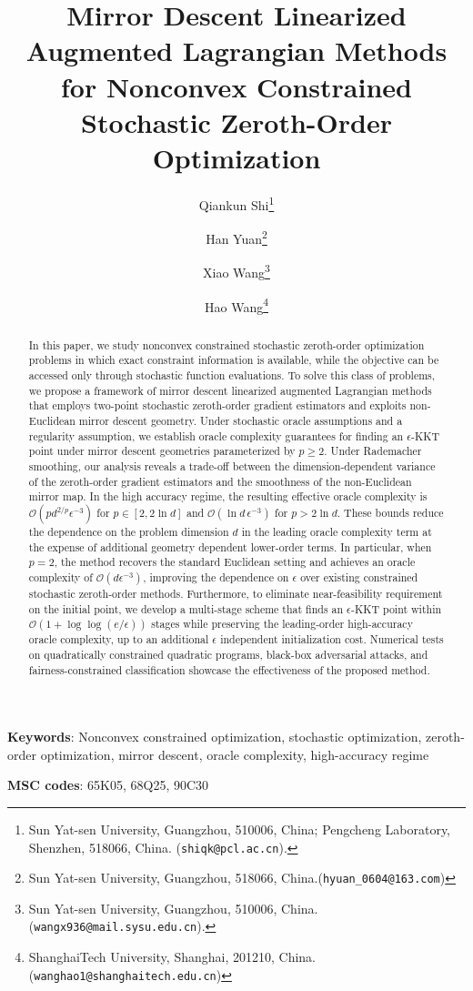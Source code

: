 \documentclass[11pt]{article}
\title{Mirror Descent Linearized Augmented Lagrangian Methods for Nonconvex Constrained Stochastic Zeroth-Order Optimization}
\author{
  Qiankun Shi\thanks{Sun Yat-sen University, Guangzhou, 510006, China; Pengcheng Laboratory, Shenzhen, 518066, China. (\texttt{shiqk@pcl.ac.cn}).}
   \and 
   Han Yuan\thanks{Sun Yat-sen University, Guangzhou, 518066, China.(\texttt{hyuan\_0604@163.com})}\and
   Xiao Wang\thanks{Sun Yat-sen University, Guangzhou, 510006, China. (\texttt{wangx936@mail.sysu.edu.cn}).} \and
   Hao Wang\thanks{ShanghaiTech University, Shanghai, 201210, China. (\texttt{wanghao1@shanghaitech.edu.cn})}
}
\numberwithin{equation}{section}
\begin{document}
\maketitle

\begin{abstract}
In this paper, we study nonconvex constrained stochastic zeroth-order optimization problems in which exact constraint information is available, while the objective can be accessed only through stochastic function evaluations. To solve this class of problems, we propose a framework of mirror descent linearized augmented Lagrangian methods that employs two-point stochastic zeroth-order gradient estimators and exploits non-Euclidean mirror descent geometry. Under stochastic oracle assumptions and a regularity assumption, we establish oracle complexity guarantees for finding an $\epsilon$-KKT point under mirror descent geometries parameterized by $p \geq 2$. Under Rademacher smoothing, our analysis reveals a trade-off between the dimension-dependent variance of the zeroth-order gradient estimators and the smoothness of the non-Euclidean mirror map. In the high accuracy regime, the resulting effective oracle complexity is $\mathcal{O}(p d^{2/p}\epsilon^{-3})$ for $p \in [2,2\ln d]$ and $\mathcal{O}(\ln d\,\epsilon^{-3})$ for $p > 2\ln d$. These bounds reduce the dependence on the problem dimension $d$ in the leading oracle complexity term at the expense of additional geometry dependent lower-order terms. In particular, when $p=2$, the method recovers the standard Euclidean setting and achieves an oracle complexity of $\mathcal{O}(d\epsilon^{-3})$, improving the dependence on $\epsilon$ over existing constrained stochastic zeroth-order methods. Furthermore, to eliminate near-feasibility requirement on the initial point, we develop a multi-stage scheme that finds an $\epsilon$-KKT point within $\mathcal{O} (1+\log\log(e/\epsilon))$ stages while preserving the leading-order high-accuracy oracle complexity, up to an additional $\epsilon$ independent initialization cost. Numerical tests on quadratically constrained quadratic programs, black-box adversarial attacks, and fairness-constrained classification showcase the effectiveness of the proposed method.
\end{abstract}

\textbf{Keywords}: Nonconvex constrained optimization, stochastic optimization, zeroth-order optimization, mirror descent, oracle complexity, high-accuracy regime

\textbf{MSC codes}: 65K05, 68Q25, 90C30
\end{document}
